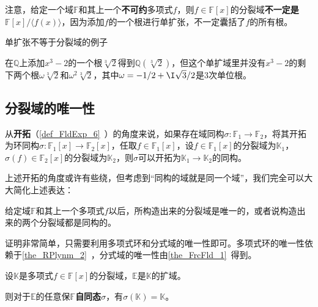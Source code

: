 注意，给定一个域$\mathbb{F}$和其上一个\textbf{不可约}多项式$f$，则$f\in\mathbb{F}[x]$的分裂域\textbf{不一定是}$\mathbb{F}[x]/\langle f(x) \rangle $，因为添加$f$的一个根进行单扩张，不一定囊括了$f$的所有根。




\begin{example}{单扩张不等于分裂域的例子}

在$\mathbb{Q}$上添加$x^3-2$的一个根$\sqrt[3]{2}$得到$\mathbb{Q}(\sqrt[3]{2})$，但这个单扩域里并没有$x^3-2$的剩下两个根$\omega\sqrt[3]{2}$和$\omega^2\sqrt[3]{2}$，其中$\omega=-1/2+\I\sqrt{3}/2$是$3$次单位根。

\end{example}










\subsection{分裂域的唯一性}

从\textbf{开拓}（\autoref{def_FldExp_6}~）的角度来说，如果存在域同构$\sigma:\mathbb{F}_1\to\mathbb{F}_2$，将其开拓为环同构$\sigma:\mathbb{F}_1[x]\to\mathbb{F}_2[x]$，任取$f\in\mathbb{F}_1[x]$，设$f\in\mathbb{F}_1[x]$的分裂域为$\mathbb{K}_1$，$\sigma(f)\in\mathbb{F}_2[x]$的分裂域为$\mathbb{K}_2$，则$\sigma$可以开拓为$\mathbb{K}_1\to\mathbb{K}_2$的同构。

上述开拓的角度或许有些绕，但考虑到“同构的域就是同一个域”，我们完全可以大大简化上述表达：

\begin{theorem}{}
给定域$\mathbb{F}$和其上一个多项式$f$以后，所构造出来的分裂域是唯一的，或者说构造出来的两个分裂域都是同构的。
\end{theorem}

证明非常简单，只需要利用多项式环和分式域的唯一性即可。多项式环的唯一性依赖于\autoref{the_RPlynm_2}~，分式域的唯一性由\autoref{the_FrcFld_1}~得到。





\begin{theorem}{}\label{the_SpltFd_3}
设$\mathbb{K}$是多项式$f\in\mathbb{F}[x]$的分裂域，$\mathbb{E}$是$\mathbb{K}$的扩域。

则对于$\mathbb{E}$的任意保$\mathbb{F}$\textbf{自同态}$\sigma$，有$\sigma(\mathbb{K})=\mathbb{K}$。
\end{theorem}


